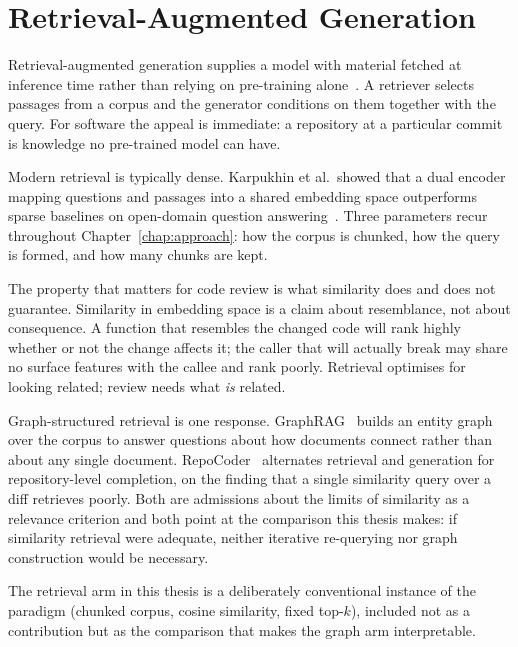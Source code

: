 \section{Retrieval-Augmented Generation}
\label{sec:bg-rag}

Retrieval-augmented generation supplies a model with material fetched at
inference time rather than relying on pre-training
alone~\cite{lewis2020rag}. A retriever selects passages from a corpus and the
generator conditions on them together with the query. For software the appeal
is immediate: a repository at a particular commit is knowledge no pre-trained
model can have.

Modern retrieval is typically dense. Karpukhin et al.\ showed that a dual
encoder mapping questions and passages into a shared embedding space
outperforms sparse baselines on open-domain question
answering~\cite{karpukhin2020dpr}. Three parameters recur throughout
Chapter~\ref{chap:approach}: how the corpus is chunked, how the query is
formed, and how many chunks are kept.

The property that matters for code review is what similarity does and does not
guarantee. Similarity in embedding space is a claim about resemblance, not
about consequence. A function that resembles the changed code will rank highly
whether or not the change affects it; the caller that will actually break may
share no surface features with the callee and rank poorly. Retrieval optimises
for looking related; review needs what \emph{is} related.

Graph-structured retrieval is one response.
GraphRAG~\cite{edge2024graphrag} builds an entity graph over the corpus to
answer questions about how documents connect rather than about any single
document. RepoCoder~\cite{zhang2023repocoder} alternates retrieval and
generation for repository-level completion, on the finding that a single
similarity query over a diff retrieves poorly. Both are admissions about the
limits of similarity as a relevance criterion and both point at the comparison
this thesis makes: if similarity retrieval were adequate, neither iterative
re-querying nor graph construction would be necessary.

The retrieval arm in this thesis is a deliberately conventional instance of the
paradigm (chunked corpus, cosine similarity, fixed top-$k$), included not
as a contribution but as the comparison that makes the graph arm
interpretable.
